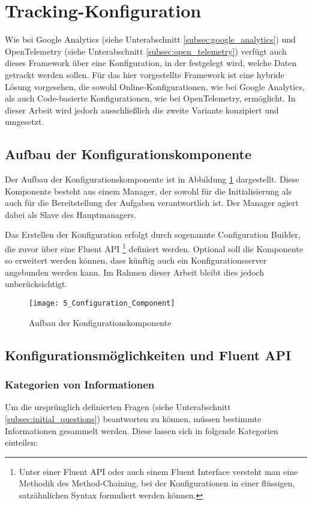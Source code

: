 \section{Tracking-Konfiguration}
\label{sec:configuration_concept}
Wie bei Google Analytics (siehe Unterabschnitt \ref{subsec:google_analytics}) und OpenTelemetry (siehe Unterabschnitt \ref{subsec:open_telemetry}) verfügt auch dieses Framework über eine Konfiguration, in der festgelegt wird, welche Daten getrackt werden sollen. Für das hier vorgestellte Framework ist eine hybride Lösung vorgesehen, die sowohl Online-Konfigurationen, wie bei Google Analytics, als auch Code-basierte Konfigurationen, wie bei OpenTelemetry, ermöglicht. In dieser Arbeit wird jedoch ausschließlich die zweite Variante konzipiert und umgesetzt.

\subsection{Aufbau der Konfigurationskomponente}
Der Aufbau der Konfigurationskomponente ist in Abbildung \ref{fig:configuration_component} dargestellt. Diese Komponente besteht aus einem Manager, der sowohl für die Initialisierung als auch für die Bereitstellung der Aufgaben verantwortlich ist. Der Manager agiert dabei als Slave des Hauptmanagers.

Das Erstellen der Konfiguration erfolgt durch sogenannte Configuration Builder, die zuvor über eine Fluent API \footnote{Unter einer Fluent API oder auch einem Fluent Interface \cite{Fowler2005FluentInterface} versteht man eine Methodik des Method-Chaining, bei der Konfigurationen in einer flüssigen, satzähnlichen Syntax formuliert werden können.} definiert werden. Optional soll die Komponente so erweitert werden können, dass künftig auch ein Konfigurationsserver angebunden werden kann. Im Rahmen dieser Arbeit bleibt dies jedoch unberücksichtigt.

\begin{figure}[H]
    \centering
    \texttt{[image: 5\_Configuration\_Component]}
    \caption{Aufbau der Konfigurationskomponente}
    \label{fig:configuration_component}
\end{figure}

\subsection{Konfigurationsmöglichkeiten und Fluent API}

\subsubsection{Kategorien von Informationen}
Um die ursprünglich definierten Fragen (siehe Unterabschnitt \ref{subsec:initial_questions}) beantworten zu können, müssen bestimmte Informationen gesammelt werden. Diese lassen sich in folgende Kategorien einteilen:

